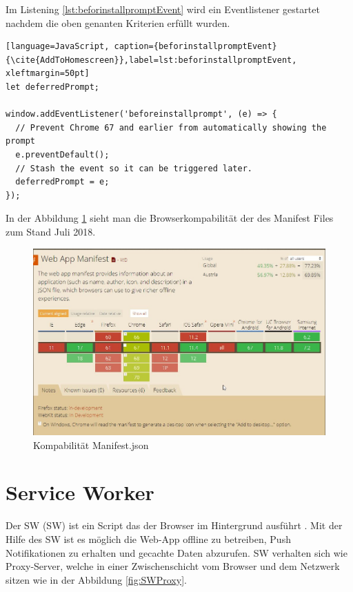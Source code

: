 \newpage
Im Listening \ref{lst:beforinstallpromptEvent} wird ein Eventlistener gestartet nachdem die oben genanten Kriterien erfüllt wurden. 


\begin{lstlisting}[language=JavaScript, caption={beforinstallpromptEvent} {\cite{AddToHomescreen}},label=lst:beforinstallpromptEvent, xleftmargin=50pt]
let deferredPrompt;

window.addEventListener('beforeinstallprompt', (e) => {
  // Prevent Chrome 67 and earlier from automatically showing the prompt
  e.preventDefault();
  // Stash the event so it can be triggered later.
  deferredPrompt = e;
});
\end{lstlisting}

In der Abbildung \ref{fig:BrowserManifest} sieht man die Browserkompabilität der des Manifest Files zum Stand Juli 2018.
 
\begin{figure}[h]
	\centering
	\includegraphics[width=14cm]{BilderAllgemein/BrowserManifest}\medskip
	\caption{Kompabilität Manifest.json \cite{BrowserSupport}}
	\label{fig:BrowserManifest}
\end{figure}
 

\newpage
\section{Service Worker}
Der \acl{SW} (\acs{SW}) ist ein Script das der Browser im Hintergrund ausführt \cite{ServiceWorkerRegistration}. Mit der Hilfe des \acs{SW} ist es möglich die \acs{Web-App} offline zu betreiben, Push Notifikationen zu erhalten und gecachte Daten abzurufen. \acs{SW} verhalten sich wie Proxy-Server, welche in einer Zwischenschicht vom Browser und dem Netzwerk sitzen wie in der Abbildung \ref{fig:SWProxy}.

